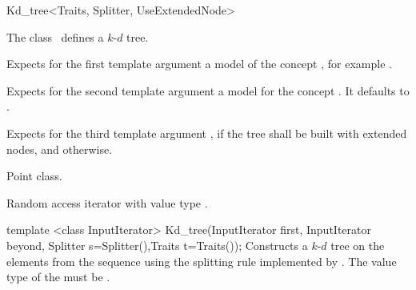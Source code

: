 

\begin{ccRefClass}{Kd_tree<Traits, Splitter, UseExtendedNode>}  %


\ccDefinition  
The class \ccRefName\ defines a $k$-$d$ tree. 


\ccParameters

Expects for the first template argument a model of the concept
, for example .

Expects for the second template argument a model for the concept .
It defaults  to .

Expects for the third template argument , if the 
tree shall be built with extended nodes, and  otherwise.

\ccTypes

 {Point class.}


\begin{ccAdvanced}
 {Random access iterator 
with value type .}
\end{ccAdvanced}

\ccCreation
{}


\ccConstructor
{template <class InputIterator> Kd_tree(InputIterator first, InputIterator beyond, Splitter s=Splitter(),Traits t=Traits());}
{
Constructs a $k$-$d$ tree on the elements from the sequence 
\ccc{[first, beyond)} using the splitting rule implemented by . 
The value type of the  must be .
}


\end{ccRefClass}
